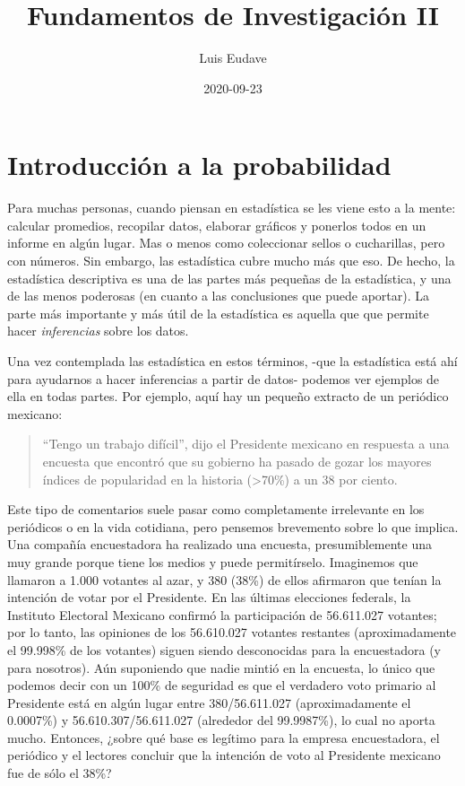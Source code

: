 \documentclass[spanish,]{book}
\title{Fundamentos de Investigación II}
\author{Luis Eudave}
\date{2020-09-23}
\begin{document}
\maketitle

{
\setcounter{tocdepth}{1}
\tableofcontents
}
\chapter{Introducción a la probabilidad}\label{probability}

Para muchas personas, cuando piensan en estadística se les viene esto a
la mente: calcular promedios, recopilar datos, elaborar gráficos y
ponerlos todos en un informe en algún lugar. Mas o menos como
coleccionar sellos o cucharillas, pero con números. Sin embargo, las
estadística cubre mucho más que eso. De hecho, la estadística
descriptiva es una de las partes más pequeñas de la estadística, y una
de las menos poderosas (en cuanto a las conclusiones que puede aportar).
La parte más importante y más útil de la estadística es aquella que que
permite hacer \emph{inferencias} sobre los datos.

Una vez contemplada las estadística en estos términos, -que la
estadística está ahí para ayudarnos a hacer inferencias a partir de
datos- podemos ver ejemplos de ella en todas partes. Por ejemplo, aquí
hay un pequeño extracto de un periódico mexicano:

\begin{quote}
``Tengo un trabajo difícil'', dijo el Presidente mexicano en respuesta a
una encuesta que encontró que su gobierno ha pasado de gozar los mayores
índices de popularidad en la historia (\textgreater{}70\%) a un 38 por
ciento.
\end{quote}

Este tipo de comentarios suele pasar como completamente irrelevante en
los periódicos o en la vida cotidiana, pero pensemos brevemento sobre lo
que implica. Una compañía encuestadora ha realizado una encuesta,
presumiblemente una muy grande porque tiene los medios y puede
permitírselo. Imaginemos que llamaron a 1.000 votantes al azar, y 380
(38\%) de ellos afirmaron que tenían la intención de votar por el
Presidente. En las últimas elecciones federals, la Instituto Electoral
Mexicano confirmó la participación de 56.611.027 votantes; por lo tanto,
las opiniones de los 56.610.027 votantes restantes (aproximadamente el
99.998\% de los votantes) siguen siendo desconocidas para la
encuestadora (y para nosotros). Aún suponiendo que nadie mintió en la
encuesta, lo único que podemos decir con un 100\% de seguridad es que el
verdadero voto primario al Presidente está en algún lugar entre
380/56.611.027 (aproximadamente el 0.0007\%) y 56.610.307/56.611.027
(alrededor del 99.9987\%), lo cual no aporta mucho. Entonces, ¿sobre qué
base es legítimo para la empresa encuestadora, el periódico y el
lectores concluir que la intención de voto al Presidente mexicano fue de
sólo el 38\%?
\end{document}

